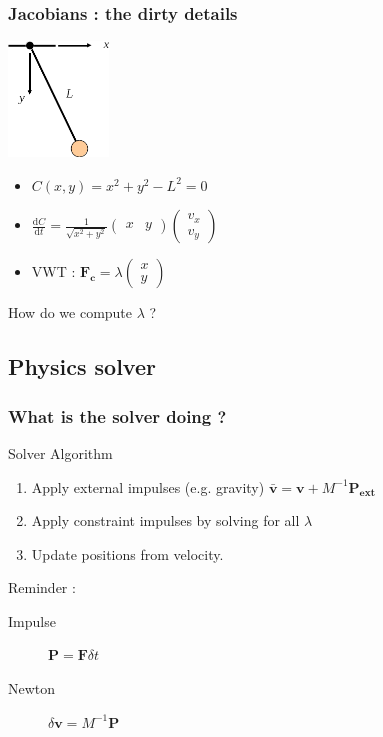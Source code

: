 \documentclass{beamer}
\begin{document}
\begin{frame}
 \frametitle{Jacobians : the dirty details}
  \begin{center}\includegraphics[width = 0.2\textwidth]{pendulum.png}\end{center}
  \begin{itemize}
    \item $C(x,y) = x^2 + y^2 - L^2 = 0$
    \pause
    \item $\frac{\mathrm{d}C}{\mathrm{d}t} = \frac{ 1 }{\sqrt{x^2+y^2}} \begin{pmatrix} x & y\end{pmatrix} \begin{pmatrix} v_x \\ v_y\end{pmatrix}$
    \pause
    \item VWT : $\mathbf{F_c} = \lambda \begin{pmatrix}x\\y\end{pmatrix}$ 
  \end{itemize}
  How do we compute $\lambda$ ?
\end{frame}

\subsection{Physics solver}

\begin{frame}
 \frametitle{What is the solver doing ?}
 \begin{block}{Solver Algorithm}
 \begin{enumerate}
  \item Apply external impulses (e.g. gravity) $\bar{\mathbf{v}} = \mathbf{v} + M^{-1} \mathbf{P_{ext}}$
  \item Apply constraint impulses by solving for all $\lambda$
  \item Update positions from velocity.
 \end{enumerate}
 \end{block}
 Reminder :
 \begin{description}
    \item[Impulse] $\mathbf{P} = \mathbf{F} \delta t$
    \item[Newton] $\delta \mathbf{v} = M^{-1} \mathbf{P}$
 \end{description}
\end{frame}
\end{document}
